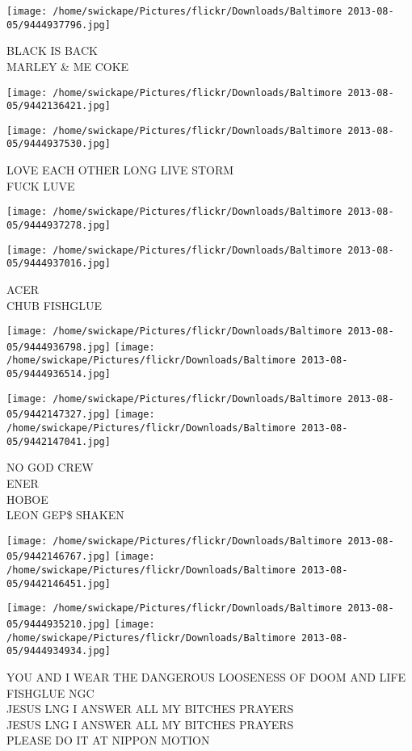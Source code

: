 \documentclass[10pt,letterpaper]{article}
\begin{document}
\vspace{0.25in}
\texttt{[image: /home/swickape/Pictures/flickr/Downloads/Baltimore 2013-08-05/9444937796.jpg]}

BLACK IS BACK\\
MARLEY \& ME COKE
\pagebreak

\texttt{[image: /home/swickape/Pictures/flickr/Downloads/Baltimore 2013-08-05/9442136421.jpg]}

\vspace{0.25in}
\texttt{[image: /home/swickape/Pictures/flickr/Downloads/Baltimore 2013-08-05/9444937530.jpg]}

LOVE EACH OTHER LONG LIVE STORM\\
FUCK LUVE
\pagebreak

\texttt{[image: /home/swickape/Pictures/flickr/Downloads/Baltimore 2013-08-05/9444937278.jpg]}

\vspace{0.25in}
\texttt{[image: /home/swickape/Pictures/flickr/Downloads/Baltimore 2013-08-05/9444937016.jpg]}

ACER\\
CHUB FISHGLUE
\pagebreak

\texttt{[image: /home/swickape/Pictures/flickr/Downloads/Baltimore 2013-08-05/9444936798.jpg]}
\texttt{[image: /home/swickape/Pictures/flickr/Downloads/Baltimore 2013-08-05/9444936514.jpg]}

\texttt{[image: /home/swickape/Pictures/flickr/Downloads/Baltimore 2013-08-05/9442147327.jpg]}
\texttt{[image: /home/swickape/Pictures/flickr/Downloads/Baltimore 2013-08-05/9442147041.jpg]}

NO GOD CREW\\
ENER\\
HOBOE\\
LEON GEP\$ SHAKEN
\pagebreak

\texttt{[image: /home/swickape/Pictures/flickr/Downloads/Baltimore 2013-08-05/9442146767.jpg]}
\texttt{[image: /home/swickape/Pictures/flickr/Downloads/Baltimore 2013-08-05/9442146451.jpg]}

\texttt{[image: /home/swickape/Pictures/flickr/Downloads/Baltimore 2013-08-05/9444935210.jpg]}
\texttt{[image: /home/swickape/Pictures/flickr/Downloads/Baltimore 2013-08-05/9444934934.jpg]}

YOU AND I WEAR THE DANGEROUS LOOSENESS OF DOOM AND LIFE FISHGLUE NGC\\
JESUS LNG I ANSWER ALL MY BITCHES PRAYERS\\
JESUS LNG I ANSWER ALL MY BITCHES PRAYERS\\
PLEASE DO IT AT NIPPON MOTION
\pagebreak
\end{document}
